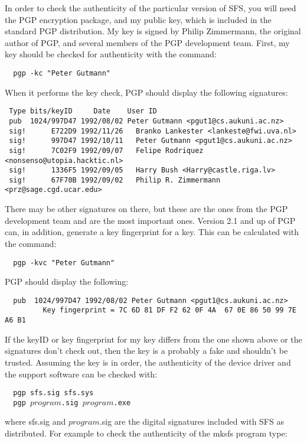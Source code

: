 In order to check the authenticity of the particular version of SFS, you will
need the PGP encryption package, and my public key, which is included in the
standard PGP distribution.  My key is signed by Philip Zimmermann, the original
author of PGP, and several members of the PGP development team.  First, my key
should be checked for authenticity with the command:

{\tt \verb|  |pgp -kc "Peter Gutmann"}

When it performs the key check, PGP should display the following signatures:
{\small

\begin{verbatim}
 Type bits/keyID     Date    User ID
 pub  1024/997D47 1992/08/02 Peter Gutmann <pgut1@cs.aukuni.ac.nz>
 sig!      E722D9 1992/11/26   Branko Lankester <lankeste@fwi.uva.nl>
 sig!      997D47 1992/10/11   Peter Gutmann <pgut1@cs.aukuni.ac.nz>
 sig!      7C02F9 1992/09/07   Felipe Rodriquez <nonsenso@utopia.hacktic.nl>
 sig!      1336F5 1992/09/05   Harry Bush <Harry@castle.riga.lv>
 sig!      67F70B 1992/09/02   Philip R. Zimmermann <prz@sage.cgd.ucar.edu>
\end{verbatim}

}
There may be other signatures on there, but these are the ones from the PGP
development team and are the most important ones.  Version 2.1 and up of PGP
can, in addition, generate a key fingerprint for a key.  This can be calculated
with the command:

{\tt \verb|  |pgp -kvc "Peter Gutmann"}

PGP should display the following:
{\small

\begin{verbatim}
  pub  1024/997D47 1992/08/02 Peter Gutmann <pgut1@cs.aukuni.ac.nz>
         Key fingerprint = 7C 6D 81 DF F2 62 0F 4A  67 0E 86 50 99 7E A6 B1
\end{verbatim}

}
If the keyID or key fingerprint for my key differs from the one shown above or
the signatures don't check out, then the key is a probably a fake and shouldn't
be trusted.  Assuming the key is in order, the authenticity of the device
driver and the support software can be checked with:

{\tt \verb|  |pgp sfs.sig sfs.sys\\
     \verb|  |pgp $program$.sig $program$.exe}

where sfs.sig and $program$.sig are the digital signatures included with SFS as
distributed.  For example to check the authenticity of the mksfs program type:

